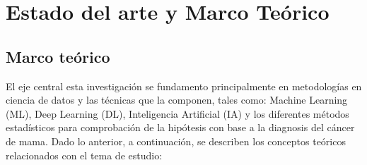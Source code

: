 \newpage
\chapter{Estado del arte y Marco Teórico}

\section{Marco teórico}

El eje central esta investigación se fundamento principalmente en metodologías en ciencia de datos y las técnicas que la componen, tales como:  Machine Learning (ML), Deep Learning (DL), Inteligencia Artificial (IA) y los diferentes métodos estadísticos para comprobación de la hipótesis con base a la diagnosis del cáncer de mama. Dado lo anterior, a continuación, se describen los conceptos teóricos relacionados con el tema de estudio:   

